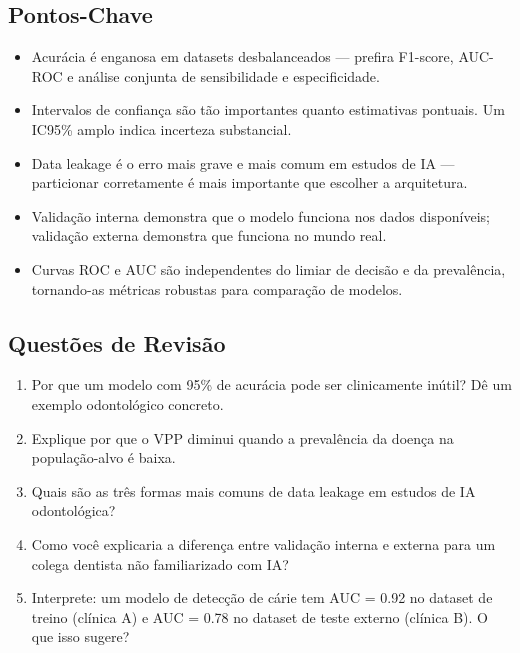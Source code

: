 \subsection{Pontos-Chave}
\begin{itemize}
    \item Acurácia é enganosa em datasets desbalanceados — prefira F1-score, AUC-ROC e análise conjunta de sensibilidade e especificidade.
    \item Intervalos de confiança são tão importantes quanto estimativas pontuais. Um IC95\% amplo indica incerteza substancial.
    \item Data leakage é o erro mais grave e mais comum em estudos de IA — particionar corretamente é mais importante que escolher a arquitetura.
    \item Validação interna demonstra que o modelo funciona nos dados disponíveis; validação externa demonstra que funciona no mundo real.
    \item Curvas ROC e AUC são independentes do limiar de decisão e da prevalência, tornando-as métricas robustas para comparação de modelos.
\end{itemize}

\subsection{Questões de Revisão}
\begin{enumerate}
    \item Por que um modelo com 95\% de acurácia pode ser clinicamente inútil? Dê um exemplo odontológico concreto.
    \item Explique por que o VPP diminui quando a prevalência da doença na população-alvo é baixa.
    \item Quais são as três formas mais comuns de data leakage em estudos de IA odontológica?
    \item Como você explicaria a diferença entre validação interna e externa para um colega dentista não familiarizado com IA?
    \item Interprete: um modelo de detecção de cárie tem AUC = 0.92 no dataset de treino (clínica A) e AUC = 0.78 no dataset de teste externo (clínica B). O que isso sugere?
\end{enumerate}


